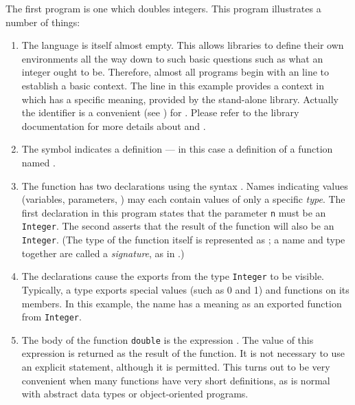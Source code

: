 The first program is one which doubles integers.
This program illustrates a number of things:
\begin{enumerate}
\item
The \asharp{} language is itself almost empty. 
This allows libraries to define their own environments all the
way down to such basic questions such as what an integer ought to be.
Therefore, almost all programs begin with an  line
to establish a basic context.
The  line in this example provides a context in
which  has a specific meaning, provided by the stand-alone
\libaldor{} library. Actually the identifier  is a convenient
 (see ) for .
Please refer to the \libaldor{} library documentation for more details
about  and .
\item The symbol \ttin{==} indicates a definition --- in this case
a definition of a function named .
\keywordIndex{==}
\item
The function has two declarations using the syntax
.  
Names indicating values (variables, parameters, \etc{})
may each contain values of only a specific {\em type}.  
The first declaration in this program
states that the parameter \verb"n" must be an \verb"Integer". 
The second asserts that the result of the function will
also be an \verb"Integer".  (The type of the function itself is
represented as ; a name and type together
are called a {\em signature}, as in
.)
\item
The declarations cause the exports from the type \verb"Integer"
to be visible.  Typically, a type exports special
values (such as 0 and 1) and functions on its members.
In this example, the name \ttin{+} has a meaning as an exported
function from \verb"Integer".
\item
The body of the function \verb"double" is the expression
.  
The value of this expression is returned as the result
of the function.  
It is not necessary to use an explicit 
statement, although it is permitted.
This turns out to be very convenient when many functions have very
short definitions, as is normal with abstract data types or
object-oriented programs.
\end{enumerate}

